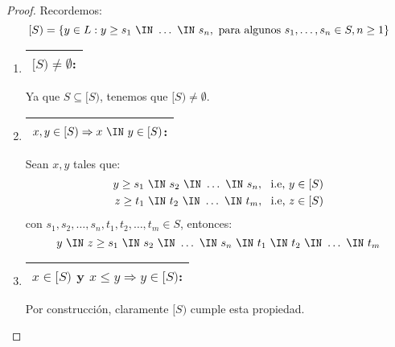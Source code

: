   \begin{proof}
    \PN Recordemos:
    \[
      [S) = \{y \in L: y \geq s_{1} \ \IN \ \dotsc \ \IN \ s_{n}, \text{ para algunos } s_{1}, \dotsc, s_{n} \in S,
      n \geq 1\}
    \]

    \begin{enumerate}
      \item \begin{tabular}{|c|} \hline $[S) \neq \emptyset$: \\\hline \end{tabular} Ya que $S \subseteq \lbrack S)$,
        tenemos que $[S) \neq \emptyset$.
      \item \begin{tabular}{|c|} \hline $x, y \in [S) \Rightarrow x \ \IN \ y \in [S)$: \\\hline \end{tabular} Sean $x,
        y$ tales que:
        \begin{eqnarray*}
          y \geq s_{1} \ \IN \ s_{2} \ \IN \ \dotsc \ \IN \ s_{n}, \ \text{ i.e, } y \in [S) \\
          z \geq t_{1} \ \IN \ t_{2} \ \IN \ \dotsc \ \IN \ t_{m}, \ \text{ i.e, } z \in [S)
        \end{eqnarray*}
        \PN con $s_{1}, s_{2}, \dotsc, s_{n}, t_{1}, t_{2}, \dotsc, t_{m} \in S$, entonces:
        \[
          y \ \IN \ z \geq s_{1} \ \IN \ s_{2} \ \IN \ \dotsc \ \IN \  s_{n} \ \IN \ t_{1} \ \IN \ t_{2} \ \IN \ \dotsc
          \ \IN \ t_{m}
        \]
      \item \begin{tabular}{|c|} \hline $x \in [S)$ y $x \leq y \Rightarrow y \in [S)$: \\\hline \end{tabular} Por
        construcción, claramente $[S)$ cumple esta propiedad.
    \end{enumerate}
  \end{proof}

